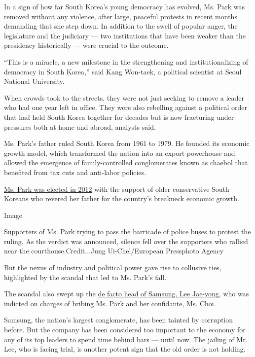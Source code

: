 In a sign of how far South Korea's young democracy has evolved, Ms. Park
was removed without any violence, after large, peaceful protests in
recent months demanding that she step down. In addition to the swell of
popular anger, the legislature and the judiciary --- two institutions
that have been weaker than the presidency historically --- were crucial
to the outcome.

``This is a miracle, a new milestone in the strengthening and
institutionalizing of democracy in South Korea,'' said Kang Won-taek, a
political scientist at Seoul National University.

When crowds took to the streets, they were not just seeking to remove a
leader who had one year left in office. They were also rebelling against
a political order that had held South Korea together for decades but is
now fracturing under pressures both at home and abroad, analysts said.

Ms. Park's father ruled South Korea from 1961 to 1979. He founded its
economic growth model, which transformed the nation into an export
powerhouse and allowed the emergence of family-controlled conglomerates
known as chaebol that benefited from tax cuts and anti-labor policies.

\href{http://www.nytimes3xbfgragh.onion/2012/12/20/world/asia/south-koreans-vote-in-closely-fought-presidential-race.html}{Ms.
Park was elected in 2012} with the support of older conservative South
Koreans who revered her father for the country's breakneck economic
growth.

Image

Supporters of Ms. Park trying to pass the barricade of police buses to
protest the ruling. As the verdict was announced, silence fell over the
supporters who rallied near the courthouse.Credit...Jung
Ui-Chel/European Pressphoto Agency

But the nexus of industry and political power gave rise to collusive
ties, highlighted by the scandal that led to Ms. Park's fall.

The scandal also swept up the
\href{https://www.nytimes3xbfgragh.onion/2017/03/09/business/jay-y-lee-samsung-trial.html}{de
facto head of Samsung, Lee Jae-yong}, who was indicted on charges of
bribing Ms. Park and her confidante, Ms. Choi.

Samsung, the nation's largest conglomerate, has been tainted by
corruption before. But the company has been considered too important to
the economy for any of its top leaders to spend time behind bars ---
until now. The jailing of Mr. Lee, who is facing trial, is another
potent sign that the old order is not holding.


